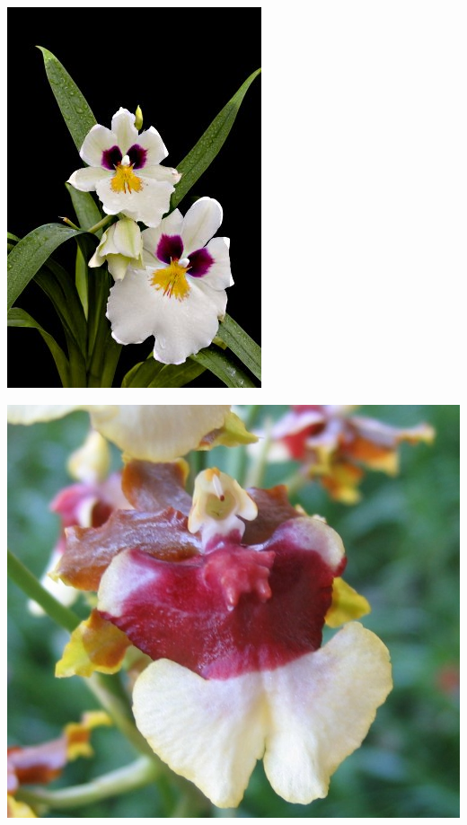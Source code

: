 \documentclass{article}
\begin{document}
\begin{center}
\includegraphics[width=0.9\textheight, angle=90]{../Orchid_Miltonia3.jpg}
\end{center}
\newpage

\begin{center}
\includegraphics[width=0.9\textheight, angle=90]{../Orchid_Oncidium.jpg}
\end{center}
\newpage
\end{document}
